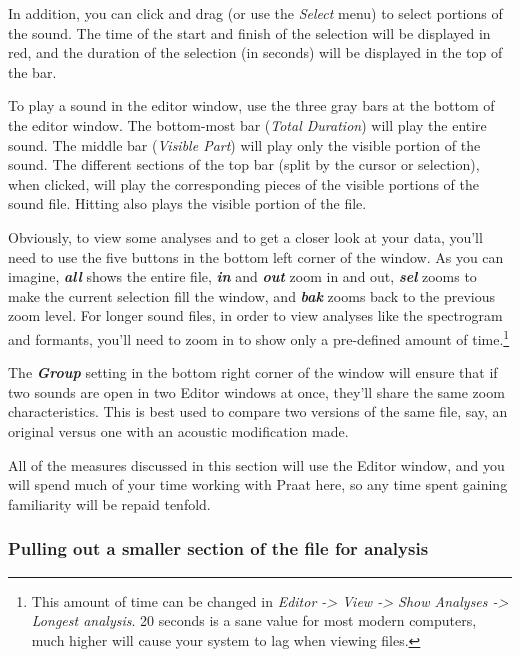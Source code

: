 In addition, you can click and drag (or use the \emph{Select} menu) to
select portions of the sound. The time of the start and finish of the
selection will be displayed in red, and the duration of the selection
(in seconds) will be displayed in the top of the bar.

To play a sound in the editor window, use the three gray bars at the
bottom of the editor window. The bottom-most bar (\emph{Total Duration})
will play the entire sound. The middle bar (\emph{Visible Part}) will
play only the visible portion of the sound. The different sections of
the top bar (split by the cursor or selection), when clicked, will play
the corresponding pieces of the visible portions of the sound file.
Hitting also plays the visible portion of the file.

Obviously, to view some analyses and to get a closer look at your data,
you'll need to use the five buttons in the bottom left corner of the
window. As you can imagine, \textbf{\emph{all}} shows the entire file,
\textbf{\emph{in}} and \textbf{\emph{out}} zoom in and out,
\textbf{\emph{sel}} zooms to make the current selection fill the window,
and \textbf{\emph{bak}} zooms back to the previous zoom level. For
longer sound files, in order to view analyses like the spectrogram and
formants, you'll need to zoom in to show only a pre-defined amount of
time.\footnote{This amount of time can be changed in \textit{Editor -> View -> Show Analyses -> Longest analysis}.  20 seconds is a sane value for most modern computers, much higher will cause your system to lag when viewing files.}

The \textbf{\emph{Group}} setting in the bottom right corner of the
window will ensure that if two sounds are open in two Editor windows at
once, they'll share the same zoom characteristics. This is best used to
compare two versions of the same file, say, an original versus one with
an acoustic modification made.

All of the measures discussed in this section will use the Editor
window, and you will spend much of your time working with Praat here, so
any time spent gaining familiarity will be repaid tenfold.

\hypertarget{pulling-out-a-smaller-section-of-the-file-for-analysis}{%
\subsubsection{Pulling out a smaller section of the file for
analysis}\label{pulling-out-a-smaller-section-of-the-file-for-analysis}}

